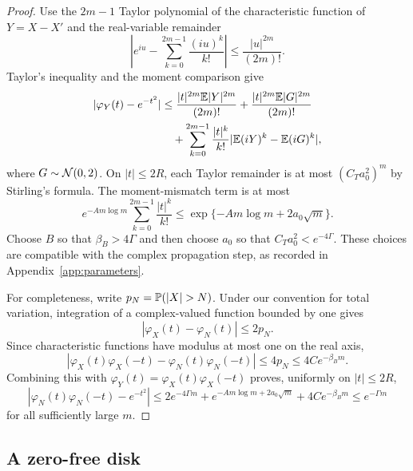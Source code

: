 \begin{proof}
Use the $2m-1$ Taylor polynomial of the characteristic function of $Y=X-X'$ and the real-variable remainder
\[
\left|e^{iu}-\sum_{k=0}^{2m-1}\frac{(iu)^k}{k!}\right|
\le\frac{|u|^{2m}}{(2m)!}.
\]
Taylor's inequality and the moment comparison give
\[
\begin{aligned}
|\varphi_Y(t)-e^{-t^2}|
&\le \frac{|t|^{2m}\mathbb E|Y|^{2m}}{(2m)!}
 +\frac{|t|^{2m}\mathbb E|G|^{2m}}{(2m)!}\\
&\quad+\sum_{k=0}^{2m-1}\frac{|t|^k}{k!}
 |\mathbb E(iY)^k-\mathbb E(iG)^k|,
\end{aligned}
\]
where $G\sim\mathcal N(0,2)$. On $|t|\le2R$, each Taylor remainder is at most $(C_Ta_0^2)^m$ by Stirling's formula. The moment-mismatch term is at most
\[
e^{-Am\log m}\sum_{k=0}^{2m-1}\frac{|t|^k}{k!}
\le \exp\{-Am\log m+2a_0\sqrt m\}.
\]
Choose $B$ so that $\beta_B>4\Gamma$ and then choose $a_0$ so that $C_Ta_0^2<e^{-4\Gamma}$. These choices are compatible with the complex propagation step, as recorded in Appendix~\ref{app:parameters}.

For completeness, write $p_N=\Pp(|X|>N)$. Under our convention for total variation, integration of a complex-valued function bounded by one gives
\[
|\varphi_X(t)-\varphi_N(t)|\le 2p_N.
\]
Since characteristic functions have modulus at most one on the real axis,
\[
|\varphi_X(t)\varphi_X(-t)-\varphi_N(t)\varphi_N(-t)|
\le4p_N\le4Ce^{-\beta_Bm}.
\]
Combining this with $\varphi_Y(t)=\varphi_X(t)\varphi_X(-t)$ proves, uniformly on $|t|\le2R$,
\[
|\varphi_N(t)\varphi_N(-t)-e^{-t^2}|
\le 2e^{-4\Gamma m}
+e^{-Am\log m+2a_0\sqrt m}
+4Ce^{-\beta_Bm}
\le e^{-\Gamma m}
\]
for all sufficiently large $m$.
\end{proof}

\subsection{A zero-free disk}


